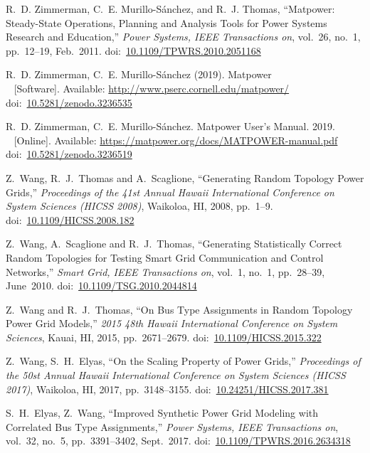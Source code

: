 \documentclass[12pt]{article}
\newcommand{\matpower}[0]{{\sc Matpower}}
\newcommand{\doi}[1]{doi:~\href{https://doi.org/#1}{#1}}
\numberwithin{equation}{section}
\numberwithin{table}{section}
\numberwithin{figure}{section}
\begin{document}
\clearpage
\begin{thebibliography}{99}

R.~D. Zimmerman, C.~E. Murillo-S{\'a}nchez, and R.~J. Thomas, ``\matpower{}: Steady-State Operations, Planning and Analysis Tools for Power Systems Research and Education,'' \emph{Power Systems, IEEE Transactions on}, vol.~26, no.~1, pp.~12--19, Feb.~2011. \doi{10.1109/TPWRS.2010.2051168}

R.~D. Zimmerman, C.~E. Murillo-S{\'a}nchez (2019). \matpower{}\\~
[Software]. Available: \url{http://www.pserc.cornell.edu/matpower/}\\
\doi{10.5281/zenodo.3236535}

R.~D. Zimmerman, C.~E. Murillo-S{\'a}nchez. \matpower{} User's Manual. 2019.\\~
[Online]. Available: \url{https://matpower.org/docs/MATPOWER-manual.pdf}\\
\doi{10.5281/zenodo.3236519}

Z.~Wang, R.~J.~Thomas and A.~Scaglione, ``Generating Random Topology Power Grids,'' \emph{Proceedings of the 41st Annual Hawaii International Conference on System Sciences (HICSS 2008)}, Waikoloa, HI, 2008, pp.~1--9.
\doi{10.1109/HICSS.2008.182}

Z.~Wang, A.~Scaglione and R.~J.~Thomas, ``Generating Statistically Correct Random Topologies for Testing Smart Grid Communication and Control Networks,'' \emph{Smart Grid, IEEE Transactions on}, vol.~1, no.~1, pp.~28--39, June~2010.
\doi{10.1109/TSG.2010.2044814}

Z.~Wang and R.~J.~Thomas, ``On Bus Type Assignments in Random Topology Power Grid Models,'' \emph{2015 48th Hawaii International Conference on System Sciences}, Kauai, HI, 2015, pp.~2671--2679.
\doi{10.1109/HICSS.2015.322}

Z.~Wang, S.~H.~Elyas, ``On the Scaling Property of Power Grids,'' \emph{Proceedings of the 50st Annual Hawaii International Conference on System Sciences (HICSS 2017)}, Waikoloa, HI, 2017, pp.~3148--3155.
\doi{10.24251/HICSS.2017.381}

S.~H.~Elyas, Z.~Wang, ``Improved Synthetic Power Grid Modeling with Correlated Bus Type Assignments,'' \emph{Power Systems, IEEE Transactions on}, vol.~32, no.~5, pp.~3391--3402, Sept.~2017.
\doi{10.1109/TPWRS.2016.2634318}


\end{thebibliography}
\end{document}
